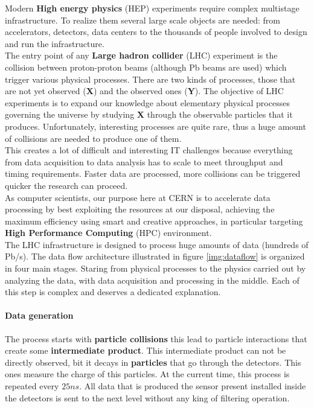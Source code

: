 Modern \textbf{High energy physics} (HEP) experiments require complex multistage infrastructure. To realize them several large scale objects are needed: from accelerators, detectors, data centers to the thousands of people involved to design and run the infrastructure.\\
The entry point of any \textbf{Large hadron collider} (LHC) experiment is the collision between proton-proton beams (although Pb beams are used) which trigger various physical processes. There are two kinds of processes, those that are not yet observed (\textbf{X}) and the observed ones (\textbf{Y}). The objective of LHC experiments is to expand our knowledge about elementary physical processes governing the universe by studying \textbf{X} through the observable particles that it produces. Unfortunately, interesting processes are quite rare, thus a huge amount of collisions are needed to produce one of them.\\
This creates a lot of difficult and interesting IT challenges because everything from data acquisition to data analysis has to scale to meet throughput and timing requirements. Faster data are processed, more collisions can be triggered quicker the research can proceed.\\
As computer scientists, our purpose here at CERN is to accelerate data processing by best exploiting the resources at our disposal, achieving the maximum efficiency using smart and creative approaches, in particular targeting \textbf{High Performance Computing} (HPC) environment. \\
The LHC infrastructure is designed to process huge amounts of data (hundreds of Pb/s). The data flow architecture illustrated in figure \ref{img:dataflow} is organized in four main stages. Staring from physical processes to the physics carried out by analyzing the data, with data acquisition and processing in the middle. Each of this step is complex and deserves a dedicated explanation. 
\paragraph{Data generation}
The process starts with \textbf{particle collisions} this lead to particle interactions that create some \textbf{intermediate product}. This intermediate product can not be directly observed, bit it decays in \textbf{particles} that go through the detectors. This ones measure the charge of this particles. At the current time, this process is repeated every $25ns$. All data that is produced the sensor present installed inside the detectors is sent to the next level without any king of filtering operation. 
